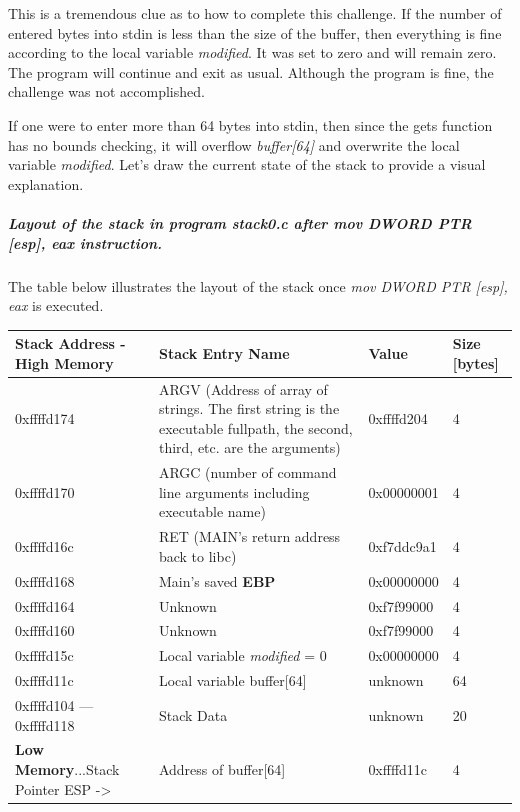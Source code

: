 This is a tremendous clue as to how to complete this challenge. If the number of entered bytes into stdin is less than the size of the buffer, then everything is fine according to the local variable \textit{modified}. It was set to zero and will remain zero. The program will continue and exit as usual. Although the program is fine, the challenge was not accomplished.

If one were to enter more than 64 bytes into stdin, then since the gets function has no bounds checking, it will overflow \textit{buffer[64]} and overwrite the local variable \textit{modified}. Let's draw the current state of the stack to provide a visual explanation.

\subparagraph{Layout of the stack in program \textit{stack0.c} after \textit{mov DWORD PTR [esp], eax} instruction.}

The table below illustrates the layout of the stack once \textit{mov DWORD PTR [esp], eax} is executed.

\bigskip\noindent
\begin{tabular}{p{}p{}p{}p{}}
\toprule
Stack Address - High Memory & Stack Entry Name & Value & Size [bytes] \\
\hline
0xffffd174 & ARGV (Address of array of strings.  The first string is the executable fullpath, the second, third, etc. are the arguments) & 0xffffd204 & 4 \\
0xffffd170 & ARGC (number of command line arguments including executable name) & 0x00000001 & 4 \\
0xffffd16c & RET (MAIN's return address back to libc) & 0xf7ddc9a1 & 4 \\
0xffffd168 & Main's saved \textbf{EBP} & 0x00000000 & 4 \\
0xffffd164 & Unknown & 0xf7f99000 & 4 \\
0xffffd160 & Unknown & 0xf7f99000 & 4 \\
0xffffd15c & Local variable \textit{modified} = 0 & 0x00000000 & 4 \\
0xffffd11c & Local variable buffer[64] & unknown & 64 \\
0xffffd104 --- 0xffffd118 & Stack Data & unknown & 20 \\
\textbf{Low Memory}...Stack Pointer ESP -\textgreater  & Address of buffer[64] & 0xffffd11c & 4 \\
\bottomrule
\end{tabular}

